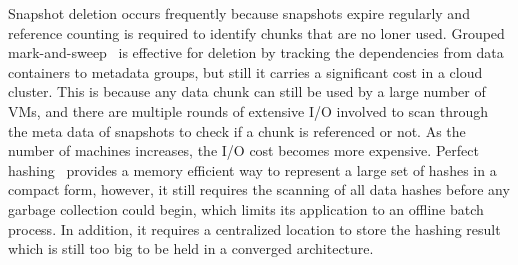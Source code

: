 Snapshot deletion 
occurs frequently because snapshots expire regularly
and reference counting is required to identify chunks that are no loner used.
Grouped mark-and-sweep~\cite{Guo2011} is effective for deletion by tracking
the dependencies from data containers to metadata groups, but still it carries
a significant cost in a cloud cluster. This is because any data chunk can still be
used by a large number of VMs, and there are multiple rounds of extensive I/O involved
to scan through the meta data of snapshots to check if a chunk is referenced or not.
As the number of machines increases, the I/O cost becomes more expensive.
Perfect hashing~\cite{Fabiano2013} provides a memory efficient way to represent a large set of
hashes in a compact form, however, it still requires the scanning of all data hashes before any 
garbage collection could begin, which limits its application to an offline batch process. 
In addition, it requires a centralized location
to store the hashing result which is still too big to be held in a converged architecture.





